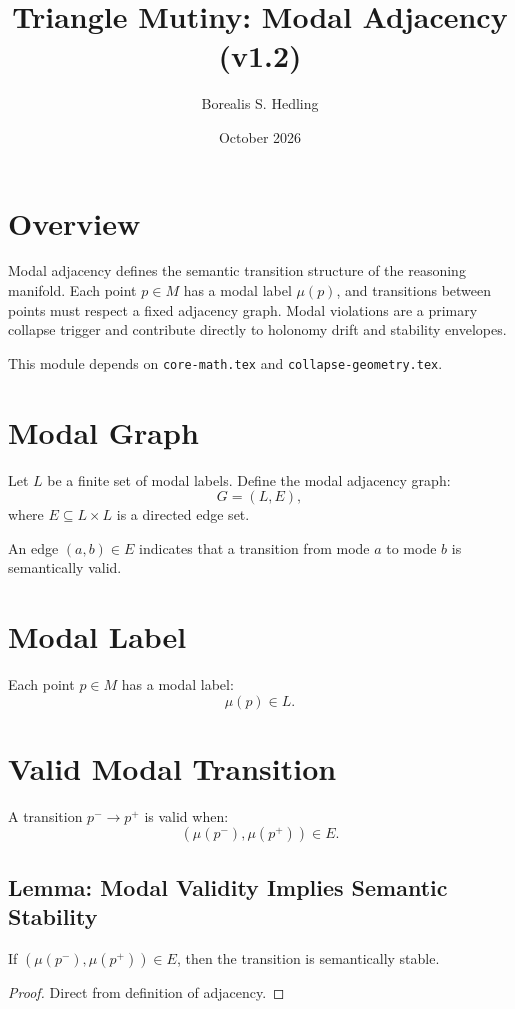 \documentclass[11pt]{article}
\title{Triangle Mutiny: Modal Adjacency (v1.2)}
\author{Borealis S. Hedling}
\date{October 2026}
\begin{document}
\maketitle

\section{Overview}

Modal adjacency defines the semantic transition structure of the reasoning
manifold. Each point $p \in M$ has a modal label $\mu(p)$, and transitions
between points must respect a fixed adjacency graph. Modal violations are
a primary collapse trigger and contribute directly to holonomy drift and
stability envelopes.

This module depends on \texttt{core-math.tex} and \texttt{collapse-geometry.tex}.

\section{Modal Graph}

Let $L$ be a finite set of modal labels. Define the modal adjacency graph:
\[
G = (L, E),
\]
where $E \subseteq L \times L$ is a directed edge set.

An edge $(a,b) \in E$ indicates that a transition from mode $a$ to mode $b$
is semantically valid.

\section{Modal Label}

Each point $p \in M$ has a modal label:
\[
\mu(p) \in L.
\]

\section{Valid Modal Transition}

A transition $p^- \to p^+$ is valid when:
\[
(\mu(p^-), \mu(p^+)) \in E.
\]

\subsection{Lemma: Modal Validity Implies Semantic Stability}
If $(\mu(p^-), \mu(p^+)) \in E$, then the transition is semantically stable.

\begin{proof}
Direct from definition of adjacency.
\end{proof}
\end{document}
